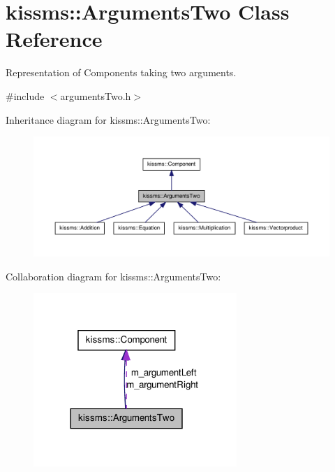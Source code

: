 \hypertarget{classkissms_1_1_arguments_two}{\section{kissms\-:\-:Arguments\-Two Class Reference}
\label{classkissms_1_1_arguments_two}
}


Representation of Components taking two arguments.  




{\ttfamily \#include $<$arguments\-Two.\-h$>$}



Inheritance diagram for kissms\-:\-:Arguments\-Two\-:
\nopagebreak
\begin{figure}[H]
\begin{center}
\leavevmode
\includegraphics[width=350pt]{classkissms_1_1_arguments_two__inherit__graph}
\end{center}
\end{figure}


Collaboration diagram for kissms\-:\-:Arguments\-Two\-:
\nopagebreak
\begin{figure}[H]
\begin{center}
\leavevmode
\includegraphics[width=218pt]{classkissms_1_1_arguments_two__coll__graph}
\end{center}
\end{figure}
